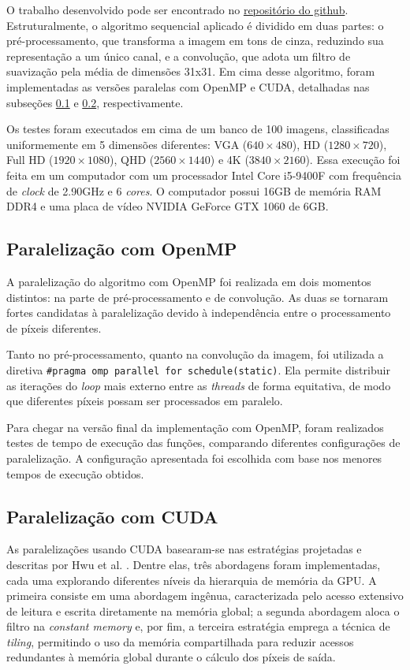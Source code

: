 \documentclass[12pt]{article}
\begin{document}
O trabalho desenvolvido pode ser encontrado no \href{https://github.com/vinicius-landim/parallel-conv-filter/}{repositório do github}. Estruturalmente, o algoritmo sequencial aplicado é dividido em duas partes: o pré-processamento, que transforma a imagem em tons de cinza, reduzindo sua representação a um único canal, e a convolução, que adota um filtro de suavização pela média de dimensões 31x31. Em cima desse algoritmo, foram implementadas as versões paralelas com OpenMP e CUDA, detalhadas nas subseções \ref{sec:openmp} e \ref{sec:cuda}, respectivamente.

Os testes foram executados em cima de um banco de 100 imagens, classificadas uniformemente em 5 dimensões diferentes: VGA ($640\times480$), HD ($1280\times720$), Full HD ($1920\times1080$), QHD ($2560\times1440$) e 4K ($3840\times2160$). Essa execução foi feita em um computador com um processador Intel Core i5-9400F com frequência de \textit{clock} de 2.90GHz e 6 \textit{cores}. O computador possui 16GB de memória RAM DDR4 e uma placa de vídeo NVIDIA GeForce GTX 1060 de 6GB.


\subsection{Paralelização com OpenMP} \label{sec:openmp}
A paralelização do algoritmo com OpenMP foi realizada em dois momentos distintos: na parte de pré-processamento e de convolução. As duas se tornaram fortes candidatas à paralelização devido à independência entre o processamento de píxeis diferentes.

Tanto no pré-processamento, quanto na convolução da imagem, foi utilizada a diretiva \texttt{\#pragma omp parallel for schedule(static)}. Ela permite distribuir as iterações do \textit{loop} mais externo entre as \textit{threads} de forma equitativa, de modo que diferentes píxeis possam ser processados em paralelo.

Para chegar na versão final da implementação com OpenMP, foram realizados testes de tempo de execução das funções, comparando diferentes configurações de paralelização. A configuração apresentada foi escolhida com base nos menores tempos de execução obtidos.

\subsection{Paralelização com CUDA} \label{sec:cuda}
As paralelizações usando CUDA basearam-se nas estratégias projetadas e descritas por Hwu et al. \cite{hwu2023}. Dentre elas, três abordagens foram implementadas, cada uma explorando diferentes níveis da hierarquia de memória da GPU. A primeira consiste em uma abordagem ingênua, caracterizada pelo acesso extensivo de leitura e escrita diretamente na memória global; a segunda abordagem aloca o filtro na \emph{constant memory} e, por fim, a terceira estratégia emprega a técnica de \emph{tiling}, permitindo o uso da memória compartilhada para reduzir acessos redundantes à memória global durante o cálculo dos píxeis de saída.
\end{document}
